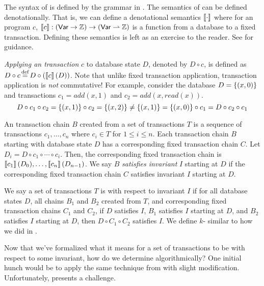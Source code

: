 The syntax of \imp{} is defined by the grammar in . The
semantics of \imp{} can be defined denotationally. That is, we can define a
denotational semantics $\left\llbracket\cdot\right\rrbracket$ where for an \imp{} program $c$,
$\left\llbracket c\right\rrbracket: (\textsf{Var} \to \mathbb{Z}) \to (\textsf{Var} \rightharpoonup \mathbb{Z})$ is a function
from a database to a fixed transaction. Defining these semantics is left as an
exercise to the reader.  See \cite{cs6110sp2016lecture19} for guidance.

\emph{Applying an \imp{} transaction} $c$ to database state $D$, denoted by $D
\circ c$, is defined as $D \circ c \defeq D \circ (\denote{c}(D))$.  Note that
unlike fixed transaction application, \imp{} transaction application is
\emph{not} commutative! For example, consider the database $D=\left\{(x, 0)\right\}$ and
\imp{} transactions $c_1 = add(x, 1)$ and $c_2 = add(x, read(x))$.
\[
  D \circ c_1 \circ c_2
    = \left\{(x, 1)\right\} \circ c_2
    = \left\{(x, 2)\right\}
    \neq \left\{(x, 1)\right\}
    = \left\{(x, 0)\right\} \circ c_1
    = D \circ c_2 \circ c_1
\]

An \imp{} transaction chain $B$ created from a set of \imp{} transactions $T$
is a sequence of transactions $c_1, \ldots, c_n$ where $c_i \in T$ for $1 \leq
i \leq n$. Each \imp{} transaction chain $B$ starting with database state $D$
has a corresponding fixed transaction chain $C$. Let $D_i = D \circ c_1 \circ
\cdots \circ c_i$. Then, the corresponding fixed transaction chain is
$\left\llbracket c_1\right\rrbracket(D_0), \ldots, \left\llbracket c_n\right\rrbracket(D_{n-1})$. We say $B$ \emph{satisfies
invariant} $I$ starting at $D$ if the corresponding fixed transaction chain $C$
satisfies invariant $I$ starting at $D$.

We say a set of \imp{} transactions $T$ is \iconfluent{} with respect to
invariant $I$ if for all database states $D$, all \imp{} chains $B_1$ and $B_2$
created from $T$, and corresponding fixed transaction chains $C_1$ and $C_2$,
if $D$ satisfies $I$, $B_1$ satisfies $I$ starting at $D$, and $B_2$ satisfies
$I$ starting at $D$, then $D \circ C_1 \circ C_2$ satisfies $I$. We define
$k$-\iconfluence{} similar to how we did in .

Now that we've formalized what it means for a set of \imp{} transactions to be
\iconfluent{} with respect to some invariant, how do we determine
\iconfluence{} algorithmically? One initial hunch would be to apply the same
technique from  with slight modification. Unfortunately,
 presents a challenge.

